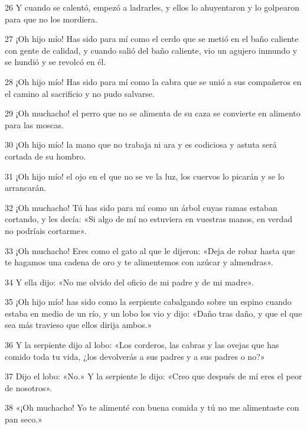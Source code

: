 \par 26 Y cuando se calentó, empezó a ladrarles, y ellos lo ahuyentaron y lo golpearon para que no los mordiera.

\par 27 ¡Oh hijo mío! Has sido para mí como el cerdo que se metió en el baño caliente con gente de calidad, y cuando salió del baño caliente, vio un agujero inmundo y se hundió y se revolcó en él.

\par 28 ¡Oh hijo mío! Has sido para mí como la cabra que se unió a sus compañeros en el camino al sacrificio y no pudo salvarse.

\par 29 ¡Oh muchacho! el perro que no se alimenta de su caza se convierte en alimento para las moscas.

\par 30 ¡Oh hijo mío! la mano que no trabaja ni ara y es codiciosa y astuta será cortada de su hombro.

\par 31 ¡Oh hijo mío! el ojo en el que no se ve la luz, los cuervos lo picarán y se lo arrancarán.

\par 32 ¡Oh muchacho! Tú has sido para mí como un árbol cuyas ramas estaban cortando, y les decía: «Si algo de mí no estuviera en vuestras manos, en verdad no podríais cortarme».

\par 33 ¡Oh muchacho! Eres como el gato al que le dijeron: «Deja de robar hasta que te hagamos una cadena de oro y te alimentemos con azúcar y almendras».

\par 34 Y ella dijo: «No me olvido del oficio de mi padre y de mi madre».

\par 35 ¡Oh hijo mío! has sido como la serpiente cabalgando sobre un espino cuando estaba en medio de un río, y un lobo los vio y dijo: «Daño tras daño, y que el que sea más travieso que ellos dirija ambos.»

\par 36 Y la serpiente dijo al lobo: «Los corderos, las cabras y las ovejas que has comido toda tu vida, ¿los devolverás a sus padres y a sus padres o no?»

\par 37 Dijo el lobo: «No.» Y la serpiente le dijo: «Creo que después de mí eres el peor de nosotros».

\par 38 «¡Oh muchacho! Yo te alimenté con buena comida y tú no me alimentaste con pan seco.»

